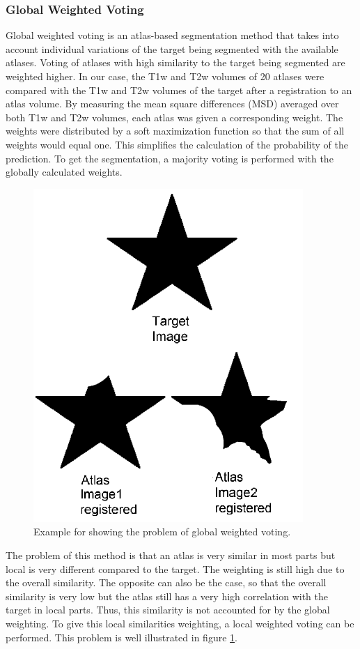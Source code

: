 \subsubsection*{Global Weighted Voting}
Global weighted voting is an atlas-based segmentation method that takes into account individual variations of the target being segmented with the available atlases. Voting of atlases with high similarity to the target being segmented are weighted higher. In our case, the T1w and T2w volumes of 20 atlases were compared with the T1w and T2w volumes of the target after a registration to an atlas volume. By measuring the mean square differences (MSD) averaged over both T1w and T2w volumes, each atlas was given a corresponding weight.  The weights were distributed by a soft maximization function so that the sum of all weights would equal one. This simplifies the calculation of the probability of the prediction. To get the segmentation, a majority voting is performed with the globally calculated weights.

\begin{figure}[h!]
	\centering
	\includegraphics[width=0.5\linewidth]{img/globalWeightedProblematic}
	\caption{Example for showing the problem of global weighted voting\cite{Artaechevarria2009}.}
	\label{fig:globalweightedproblematic}
\end{figure}

The problem of this method is that an atlas is very similar in most parts but local is very different compared to the target. The weighting is still high due to the overall similarity. The opposite can also be the case, so that the overall similarity is very low but the atlas still has a very high correlation with the target in local parts. Thus, this similarity is not accounted for by the global weighting. To give this local similarities weighting, a local weighted voting can be performed. This problem is well illustrated in figure \ref{fig:globalweightedproblematic}.

